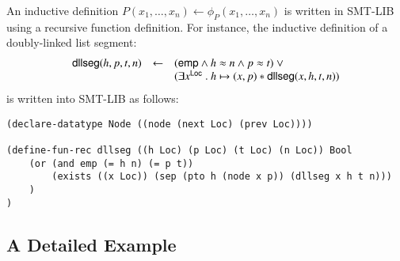 \documentclass{llncs}
\begin{document}
An inductive definition $P(x_1,\ldots,x_n) \leftarrow
\phi_P(x_1,\ldots,x_n)$ is written in SMT-LIB using a recursive
function definition. For instance, the inductive definition of a 
doubly-linked list segment:
\[\begin{array}{rcl}
\mathsf{dllseg}(h, p, t, n) & \leftarrow & (\mathsf{emp} \wedge h \approx n \wedge p \approx t) ~\vee \\
&& (\exists x^{\mathsf{Loc}} ~.~ h \mapsto (x,p) * \mathsf{dllseg}(x,h,t,n))
\end{array}\]
is written into SMT-LIB as follows: 
\begin{verbatim}
(declare-datatype Node ((node (next Loc) (prev Loc))))

(define-fun-rec dllseg ((h Loc) (p Loc) (t Loc) (n Loc)) Bool
    (or (and emp (= h n) (= p t))
        (exists ((x Loc)) (sep (pto h (node x p)) (dllseg x h t n)))
    )
)
\end{verbatim}

\subsection{A Detailed Example} 
\end{document}
